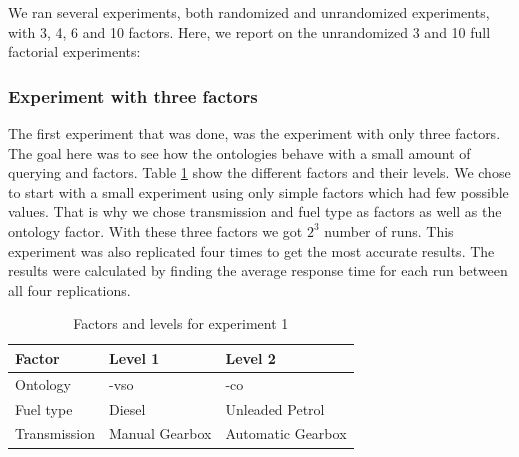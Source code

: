 \documentclass{llncs}
\begin{document}
We ran several experiments, both randomized and unrandomized
experiments, with 3, 4, 6 and 10 factors. Here, we report on the
unrandomized 3 and 10 full factorial experiments:
  
\subsubsection{Experiment with three factors}
The first experiment that was done, was the experiment with only three
factors. The goal here was to see how the ontologies behave with a
small amount of querying and factors.  Table \ref{facandlevExp1} show
the different factors and their levels. We chose to start with a small
experiment using only simple factors which had few possible
values. That is why we chose transmission and fuel type as factors as
well as the ontology factor. With these three factors we got $2^3$
number of runs. This experiment was also replicated four times to get the
most accurate results.  The results were calculated by finding the
average response time for each run between all four replications.

\begin{table}
    \begin{tabular}{ | l | l l |}
    \hline
    {\bf Factor} & {\bf Level 1} & {\bf Level 2} \\ \hline
	Ontology & -vso & -co \\ \hline 
	Fuel type & Diesel & Unleaded Petrol \\ \hline 
	Transmission & Manual Gearbox & Automatic Gearbox \\ \hline 
    \end{tabular}
\caption{Factors and levels for experiment 1}\label{facandlevExp1}
\end{table}
\end{document}

